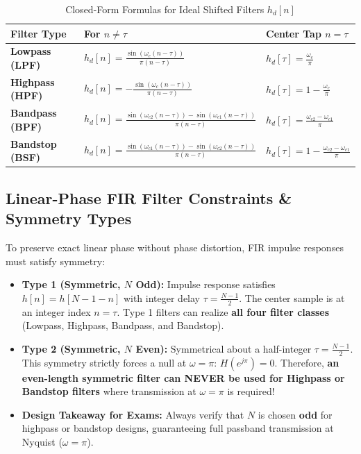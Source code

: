 \documentclass[11pt,a4paper]{article}
\begin{document}
\begin{table}[H]
\centering
\caption{Closed-Form Formulas for Ideal Shifted Filters $h_d[n]$}
\label{tab:hd_formulas}
\vspace{2mm}
\begin{tabular}{lll}
\toprule
\textbf{Filter Type} & \textbf{For $n \ne \tau$} & \textbf{Center Tap $n = \tau$} \\
\midrule
\textbf{Lowpass (LPF)} & $h_d[n] = \frac{\sin(\omega_c(n-\tau))}{\pi(n-\tau)}$ & $h_d[\tau] = \frac{\omega_c}{\pi}$ \\
\textbf{Highpass (HPF)} & $h_d[n] = -\frac{\sin(\omega_c(n-\tau))}{\pi(n-\tau)}$ & $h_d[\tau] = 1 - \frac{\omega_c}{\pi}$ \\
\textbf{Bandpass (BPF)} & $h_d[n] = \frac{\sin(\omega_{c2}(n-\tau)) - \sin(\omega_{c1}(n-\tau))}{\pi(n-\tau)}$ & $h_d[\tau] = \frac{\omega_{c2} - \omega_{c1}}{\pi}$ \\
\textbf{Bandstop (BSF)} & $h_d[n] = \frac{\sin(\omega_{c1}(n-\tau)) - \sin(\omega_{c2}(n-\tau))}{\pi(n-\tau)}$ & $h_d[\tau] = 1 - \frac{\omega_{c2} - \omega_{c1}}{\pi}$ \\
\bottomrule
\end{tabular}
\end{table}

\subsection{Linear-Phase FIR Filter Constraints \& Symmetry Types}
To preserve exact linear phase without phase distortion, FIR impulse responses must satisfy symmetry:
\begin{itemize}
    \item \textbf{Type 1 (Symmetric, $N$ Odd):} Impulse response satisfies $h[n] = h[N-1-n]$ with integer delay $\tau = \frac{N-1}{2}$. The center sample is at an integer index $n = \tau$. Type 1 filters can realize \textbf{all four filter classes} (Lowpass, Highpass, Bandpass, and Bandstop).
    \item \textbf{Type 2 (Symmetric, $N$ Even):} Symmetrical about a half-integer $\tau = \frac{N-1}{2}$. This symmetry strictly forces a null at $\omega = \pi$: $H(e^{j\pi}) = 0$. Therefore, \textbf{an even-length symmetric filter can NEVER be used for Highpass or Bandstop filters} where transmission at $\omega = \pi$ is required!
    \item \textbf{Design Takeaway for Exams:} Always verify that $N$ is chosen \textbf{odd} for highpass or bandstop designs, guaranteeing full passband transmission at Nyquist ($\omega = \pi$).
\end{itemize}
\end{document}

